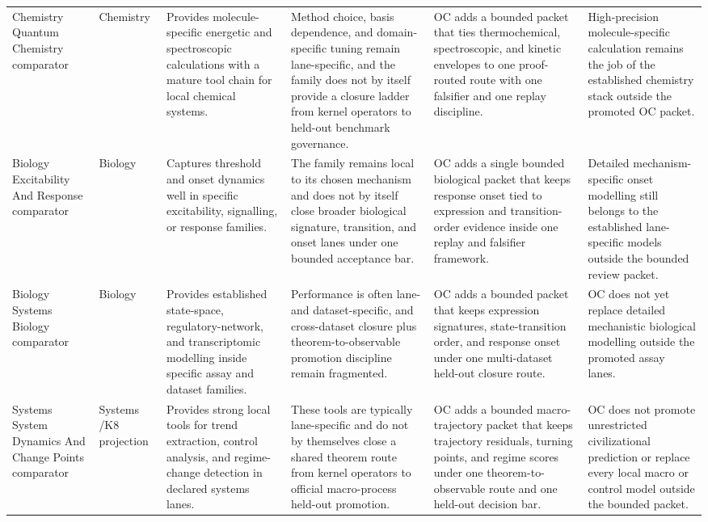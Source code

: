 \begin{longtable}{@{}L{0.17\textwidth}L{0.09\textwidth}L{0.17\textwidth}L{0.17\textwidth}L{0.20\textwidth}L{0.14\textwidth}@{}}
Chemistry Quantum Chemistry comparator & Chemistry & Provides molecule-specific energetic and spectroscopic calculations with a mature tool chain for local chemical systems. & Method choice, basis dependence, and domain-specific tuning remain lane-specific, and the family does not by itself provide a closure ladder from kernel operators to held-out benchmark governance. & OC adds a bounded packet that ties thermochemical, spectroscopic, and kinetic envelopes to one proof-routed route with one falsifier and one replay discipline. & High-precision molecule-specific calculation remains the job of the established chemistry stack outside the promoted OC packet. \\
Biology Excitability And Response comparator & Biology & Captures threshold and onset dynamics well in specific excitability, signalling, or response families. & The family remains local to its chosen mechanism and does not by itself close broader biological signature, transition, and onset lanes under one bounded acceptance bar. & OC adds a single bounded biological packet that keeps response onset tied to expression and transition-order evidence inside one replay and falsifier framework. & Detailed mechanism-specific onset modelling still belongs to the established lane-specific models outside the bounded review packet. \\
Biology Systems Biology comparator & Biology & Provides established state-space, regulatory-network, and transcriptomic modelling inside specific assay and dataset families. & Performance is often lane- and dataset-specific, and cross-dataset closure plus theorem-to-observable promotion discipline remain fragmented. & OC adds a bounded packet that keeps expression signatures, state-transition order, and response onset under one multi-dataset held-out closure route. & OC does not yet replace detailed mechanistic biological modelling outside the promoted assay lanes. \\
Systems System Dynamics And Change Points comparator & Systems /\allowbreak K8 projection & Provides strong local tools for trend extraction, control analysis, and regime-change detection in declared systems lanes. & These tools are typically lane-specific and do not by themselves close a shared theorem route from kernel operators to official macro-process held-out promotion. & OC adds a bounded macro-trajectory packet that keeps trajectory residuals, turning points, and regime scores under one theorem-to-observable route and one held-out decision bar. & OC does not promote unrestricted civilizational prediction or replace every local macro or control model outside the bounded packet. \\

\end{longtable}
